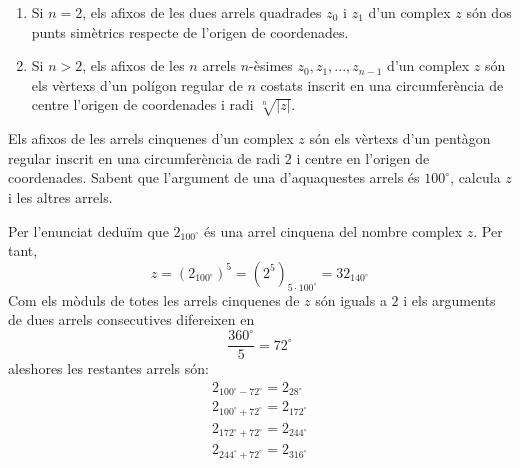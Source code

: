 \begin{enumerate}
\item[1)] Si $n=2$, els afixos de les dues arrels quadrades $z_{0}$ i $
z_{1}$ d’un complex $z$ són dos punts simètrics respecte de l’origen
de coordenades.

\item[2)] Si $n>2$, els afixos de les $n$ arrels $n$-èsimes $
z_{0},z_{1},...,z_{n-1}$ d’un complex $z$ són els vèrtexs d’un polígon regular de $n$ costats inscrit en una circumferència de centre l’origen de coordenades i radi $\sqrt[n]{\left\vert z\right\vert }$.
\end{enumerate}

\begin{exemple}
Els afixos de les arrels cinquenes d’un complex $z$ són els vèrtexs d’un pentàgon regular inscrit en una circumferència de radi $
2 $ i centre en l’origen de coordenades. Sabent que l’argument de una
d’aquaquestes arrels és $100
^{\circ}
$, calcula $z$ i les altres arrels.
\end{exemple}

\begin{solucio}
Per l’enunciat deduïm que $2_{100
^{\circ}
}$ és una arrel cinquena del nombre complex $z$. Per tant,
\begin{equation*}
z=\left( 2_{100
^{\circ}
}\right) ^{5}=\left( 2^{5}\right) _{5\cdot 100
^{\circ}
}=32_{140
^{\circ}
}
\end{equation*}
Com els mòduls de totes les arrels cinquenes de $z$ són iguals a $
2 $ i els arguments de dues arrels consecutives difereixen en
\begin{equation*}
\frac{360
^{\circ}
}{5}=72
^{\circ}
\end{equation*}
aleshores les restantes arrels són:
\begin{equation*}
\begin{array}{l}
2_{100
^{\circ}
-72
^{\circ}
}=2_{28
^{\circ}
} \\
2_{100
^{\circ}
+72
^{\circ}
}=2_{172
^{\circ}
} \\
2_{172
^{\circ}
+72
^{\circ}
}=2_{244
^{\circ}
} \\
2_{244
^{\circ}
+72
^{\circ}
}=2_{316
^{\circ}
}
\end{array}
\end{equation*}
\end{solucio}
